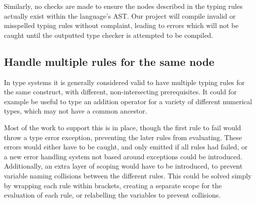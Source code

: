 \documentclass[nofilelist]{cslthse-msc}
\newcommand{\CR}[1]{\textcolor{green!60!black}{[\textbf{CR}:#1]}}
\begin{document}
Similarly, no checks are made to ensure the nodes described in the typing rules actually exist within the language's AST.
Our project will compile invalid or misspelled typing rules without complaint, leading to errors which will not be caught until the outputted type checker is attempted to be compiled.

\subsection{Handle multiple rules for the same node}
In type systems it is generally considered valid to have multiple typing rules for the same construct, with different, non-intersecting prerequisites.
It could for example be useful to type an addition operator for a variety of different numerical types, which may not have a common ancestor.

Most of the work to support this is in place, though the first rule to fail would throw a type error exception, preventing the later rules from evaluating.
These errors would either have to be caught, and only emitted if all rules had failed, or a new error handling system not based around exceptions could be introduced.
Additionally, an extra layer of scoping would have to be introduced, to prevent variable naming collisions between the different rules.
This could be solved simply by wrapping each rule within brackets, creating a separate scope for the evaluation of each rule, or relabelling the variables to prevent collisions.





{} %
\end{document}
